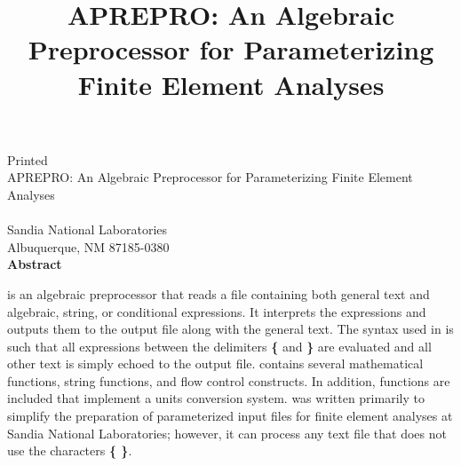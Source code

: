 \newif\ifdraft\draftfalse
\newif\ifsand\sandtrue

\SANDprintDate{\today}
\newcommand{\theTitle}{APREPRO: An Algebraic Preprocessor for Parameterizing Finite Element Analyses}
\title{\theTitle}
\ifsand
{}
\newpage
\else
\SANDmarks{cover}
\setcounter{page}{3}
\fi


\begin{center}
\ifdraft
Draft Date: \SANDprintDateVar\\
\else
Printed \SANDprintDateVar\\
\fi

\vspace{0.75in}
\theTitle\\
\vspace{0.75in}
\SANDauthorVar\\
Sandia National Laboratories\\
Albuquerque, NM 87185-0380\\
\vspace*{.5in}
\textbf{Abstract}
\end{center}
\vspace{-.4cm}\par

\aprepro{} is an algebraic preprocessor that reads a file containing both
general\textit{ }text and algebraic, string, or conditional expressions. It interprets
the expressions and outputs them to the output file along with the general text.
The syntax used in \aprepro{} is such that all expressions between the delimiters
\textbf{\{} and \textbf{\}} are evaluated and all other text is simply echoed to
the output file. \aprepro{} contains several mathematical functions,
string functions, and flow control constructs. In addition, functions
are included that implement a units conversion system. \aprepro{} was
written primarily to simplify the preparation of parameterized input
files for finite element analyses at Sandia National Laboratories;
however, it can process any text file that does not use the characters
\textbf{\{ \}}.\newpage

